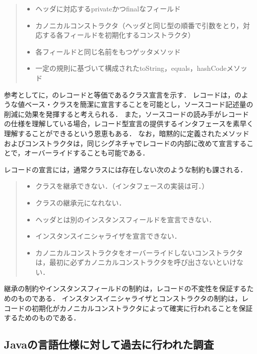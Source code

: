 \begin{quote}
    \begin{itemize}
        \item ヘッダに対応するprivateかつfinalなフィールド
        \item カノニカルコンストラクタ（ヘッダと同じ型の順番で引数をとり，対応する各フィールドを初期化するコンストラクタ）
        \item 各フィールドと同じ名前をもつゲッタメソッド
        \item 一定の規則に基づいて構成されたtoString，equals，hashCodeメソッド
    \end{itemize}
\end{quote}


参考としてに，のレコードと等価であるクラス宣言を示す．
レコードは，のような値ベース・クラスを簡潔に宣言することを可能とし，ソースコード記述量の削減に効果を発揮すると考えられる．
また，ソースコードの読み手がレコードの仕様を理解している場合，レコード型宣言の提供するインタフェースを素早く理解することができるという恩恵もある．
なお，暗黙的に定義されたメソッドおよびコンストラクタは，同じシグネチャでレコードの内部に改めて宣言することで，オーバーライドすることも可能である．

レコードの宣言には，通常クラスには存在しない次のような制約も課される\cite{JLS17}．

\begin{quote}
    \begin{itemize}
        \item クラスを継承できない．（インタフェースの実装は可．）
        \item クラスの継承元になれない．
        \item ヘッダとは別のインスタンスフィールドを宣言できない．
        \item インスタンスイニシャライザを宣言できない．
        \item カノニカルコンストラクタをオーバーライドしないコンストラクタは，最初に必ずカノニカルコンストラクタを呼び出さないといけない．
    \end{itemize}
\end{quote}

継承の制約やインスタンスフィールドの制約は，レコードの不変性を保証するためのものである．
インスタンスイニシャライザとコンストラクタの制約は，レコードの初期化がカノニカルコンストラクタによって確実に行われることを保証するためのものである．

\subsection{Javaの言語仕様に対して過去に行われた調査\label{related_works}}
